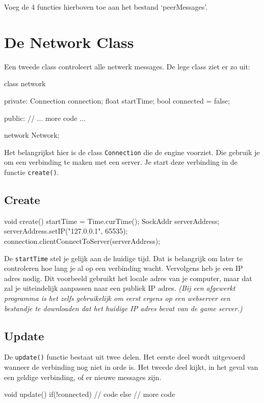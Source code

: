 \begin{exercise}
Voeg de 4 functies hierboven toe aan het bestand `peerMessages'.
\end{exercise}

\section{De Network Class}
Een tweede class controleert alle netwerk messages. De lege class ziet er zo uit:

\begin{code}
class network
{
private:
   Connection connection;
	 float startTime;
	 bool connected = false;
	
public:
   // ... more code ...
}
network Network;
\end{code}

Het belangrijkst hier is de class \texttt{Connection} die de engine voorziet. Die gebruik je om een verbinding te maken met een server. Je start deze verbinding in de functie \texttt{create()}.

\subsection{Create}
\begin{code}
void create()
{
	startTime = Time.curTime();
	SockAddr serverAddress;
	serverAddress.setIP("127.0.0.1", 65535);
	connection.clientConnectToServer(serverAddress);
}
\end{code}

De \texttt{startTime} stel je gelijk aan de huidige tijd. Dat is belangrijk om later te controleren hoe lang je al op een verbinding wacht. Vervolgens heb je een IP adres nodig. Dit voorbeeld gebruikt het locale adres van je computer, maar dat zal je uiteindelijk aanpassen naar een publiek IP adres. \textsl{(Bij een afgewerkt programma is het zelfs gebruikelijk om eerst ergens op een webserver een bestandje te downloaden dat het huidige IP adres bevat van de game server.)}

\subsection{Update}
De \texttt{update()} functie bestaat uit twee delen. Het eerste deel wordt uitgevoerd wanneer de verbinding nog niet in orde is. Het tweede deel kijkt, in het geval van een geldige verbinding, of er nieuwe messages zijn.

\begin{code}
void update()
{
   if(!connected)
	 {
	    // code
	 } else {
	    // more code
	 }
}
\end{code}

